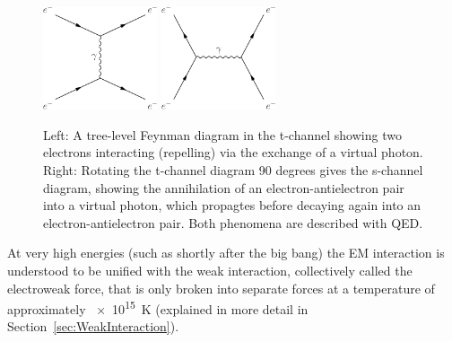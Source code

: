 \begin{figure}[H]
    \centering
    \vspace{0.05\textwidth}
    {\includegraphics[width=0.3\textwidth]{Images/Theory/QEDInteraction.pdf}\hspace{0.1\textwidth}}
    {\includegraphics[width=0.3\textwidth]{Images/Theory/QED_s_channel.pdf}\vspace{0.05\textwidth}}
    \caption{Left: A tree-level Feynman diagram in the t-channel showing two electrons interacting (repelling) via the exchange of a virtual photon. Right: Rotating the t-channel diagram 90 degrees gives the s-channel diagram, showing the annihilation of an electron-antielectron pair into a virtual photon, which propagtes before decaying again into an electron-antielectron pair. Both phenomena are described with QED.}
    \label{fig:QEDFeynmanDiagram}
\end{figure}
At very high energies (such as shortly after the big bang) the EM interaction is understood to be unified with the weak interaction, collectively called the electroweak force, that is only broken into separate forces at a temperature of approximately \SI{e15}{K} (explained in more detail in Section~\ref{sec:WeakInteraction}).